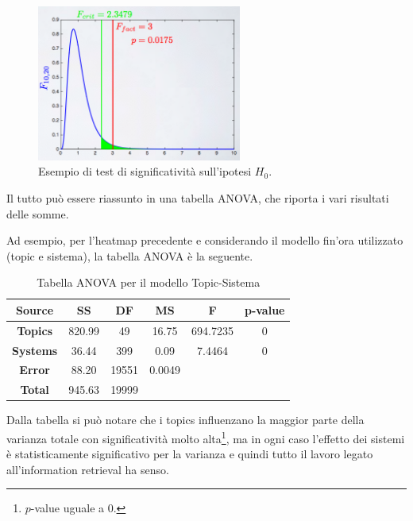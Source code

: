 \begin{figure}[htbp]
	\centering
	\includegraphics[width=0.6\textwidth]{images/l21-fig-1}
	\caption{Esempio di test di significatività sull'ipotesi $H_0$.}
\end{figure}

Il tutto può essere riassunto in una tabella ANOVA, che riporta i vari risultati delle somme.

Ad esempio, per l'heatmap precedente e considerando il modello fin'ora utilizzato (topic e sistema), la tabella ANOVA è la seguente.

\begin{table}[htbp]
	\centering
	\begin{tabular}{|c|c|c|c|c|c|}
		\hline
		\textbf{Source}  & \textbf{SS} & \textbf{DF} & \textbf{MS} & \textbf{F} & \textbf{p-value} \\ \hline
		\textbf{Topics}  & 820.99      & 49          & 16.75       & 694.7235   & 0                \\ \hline
		\textbf{Systems} & 36.44       & 399         & 0.09        & 7.4464     & 0                \\ \hline
		\textbf{Error}   & 88.20       & 19551       & 0.0049      &            &                  \\ \hline
		\textbf{Total}   & 945.63      & 19999       &             &            &                  \\ \hline
	\end{tabular}
	\caption{Tabella ANOVA per il modello Topic-Sistema}\label{my-label}
\end{table}

Dalla tabella si può notare che i topics influenzano la maggior parte della varianza totale con significatività molto alta\footnote{$p$-value uguale a 0.}, ma in ogni caso l'effetto dei sistemi è statisticamente significativo per la varianza e quindi tutto il lavoro legato all'information retrieval ha senso.

